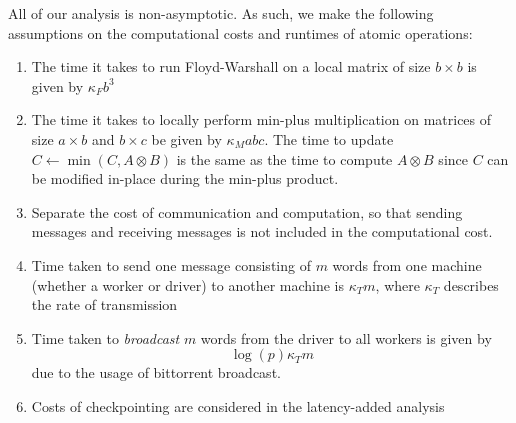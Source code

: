 \documentclass{article} %
\begin{document}
All of our analysis is non-asymptotic.  As such, we make the following
assumptions on the computational costs and runtimes of atomic
operations:

\begin{enumerate}
\item The time it takes to run Floyd-Warshall on a local matrix of size $b \times b$ is given by $\kappa_F b^3$
\item The time it takes to locally perform min-plus multiplication on
  matrices of size $a \times b$ and $b \times c$ be given by $\kappa_M
  abc$. The time to update $C \leftarrow \min(C, A \otimes B)$ is the
  same as the time to compute $A \otimes B$ since $C$ can be modified in-place during the min-plus product.
\item Separate the cost of communication and computation, so that
  sending messages and receiving messages is not included in the
  computational cost.
\item Time taken to send one message consisting of $m$ words from one
  machine (whether a worker or driver) to another machine is $\kappa_T m$,
where $\kappa_T$ describes the rate of transmission
\item Time taken to \emph{broadcast} $m$ words from the driver to all workers is given by
\[
\log(p) \kappa_T m
\]
due to the usage of bittorrent broadcast.
\item Costs of checkpointing are considered in the latency-added analysis
\end{enumerate}
\end{document}
